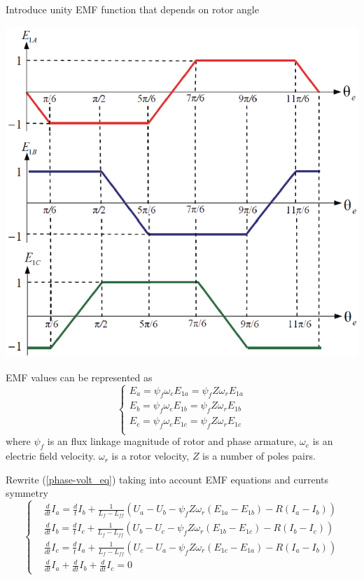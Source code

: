 \documentclass[11pt,a4paper,oneside]{report}
\begin{document}
Introduce unity EMF function that depends on rotor angle

\begin{center}
	\includegraphics[scale=0.7]{emf}
\end{center}

EMF values can be represented as
\begin{equation}
	\left\{
	\begin{split}
		E_a=\psi_f\omega_eE_{1a}=\psi_fZ\omega_rE_{1a}\\
		E_b=\psi_f\omega_eE_{1b}=\psi_fZ\omega_rE_{1b}\\
		E_c=\psi_f\omega_eE_{1c}=\psi_fZ\omega_rE_{1c}\\
	\end{split}
	\right.
\end{equation}
where $\psi_f$ is an flux linkage magnitude of rotor and phase armature, $\omega_e$ is an electric field velocity. $\omega_r$ is a rotor velocity, $Z$ is a number of poles pairs.

Rewrite (\ref{phase-volt_eq}) taking into account EMF equations and currents symmetry
\begin{equation}
	\left\{
	\begin{split}
		&\frac{d}{dt}I_a=\frac{d}{t}I_b+  \frac{1}{L_f-L_{ff}}\left(U_a-U_b-\psi_fZ\omega_r(E_{1a}-E_{1b})-R(I_a-I_b) \right)\\
		&\frac{d}{dt}I_b=\frac{d}{t}I_c+  \frac{1}{L_f-L_{ff}}\left(U_b-U_c-\psi_fZ\omega_r(E_{1b}-E_{1c})-R(I_b-I_c) \right)\\
		&\frac{d}{dt}I_c=\frac{d}{t}I_a+  \frac{1}{L_f-L_{ff}}\left(U_c-U_a-\psi_fZ\omega_r(E_{1c}-E_{1a})-R(I_a-I_b) \right)\\
		&\frac{d}{dt}I_a+\frac{d}{dt}I_b+\frac{d}{dt}I_c=0
	\end{split}
	\right.
\end{equation}
\end{document}
